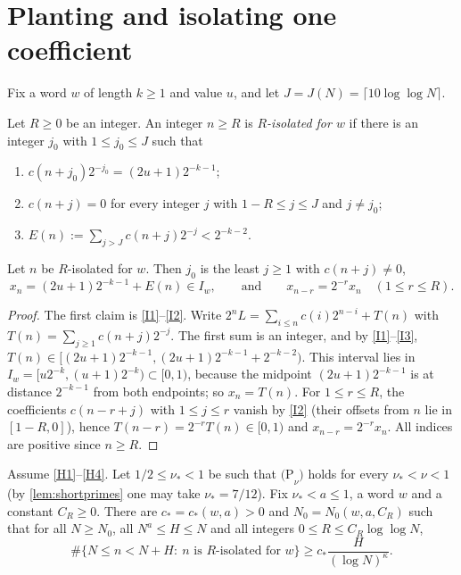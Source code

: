 \documentclass[11pt]{article}
\begin{document}
\section{Planting and isolating one coefficient}\label{sec:planting}

Fix a word $w$ of length $k\ge1$ and value $u$, and let
$J=J(N)=\lceil10\log\log N\rceil$.

\begin{definition}\label{def:isolated}
Let $R\ge0$ be an integer. An integer $n\ge R$ is \emph{$R$-isolated for $w$}
if there is an integer $j_0$ with $1\le j_0\le J$ such that
\begin{enumerate}[label=\textup{(I\arabic*)}]
\item\label{I1} $c(n+j_0)2^{-j_0}=(2u+1)2^{-k-1}$;
\item\label{I2} $c(n+j)=0$ for every integer $j$ with $1-R\le j\le J$ and $j\ne j_0$;
\item\label{I3} $E(n):=\sum_{j>J}c(n+j)2^{-j}<2^{-k-2}$.
\end{enumerate}
\end{definition}

\begin{lemma}\label{lem:isolated}
Let $n$ be $R$-isolated for $w$. Then $j_0$ is the least
$j\ge1$ with $c(n+j)\ne0$,
\[
x_n=(2u+1)2^{-k-1}+E(n)\in I_w,\qquad\text{and}\qquad x_{n-r}=2^{-r}x_n\quad(1\le r\le R).
\]
\end{lemma}

\begin{proof}
The first claim is \ref{I1}--\ref{I2}. Write
$2^{n}L=\sum_{i\le n}c(i)2^{n-i}+T(n)$ with $T(n)=\sum_{j\ge1}c(n+j)2^{-j}$. The
first sum is an integer, and by \ref{I1}--\ref{I3},
$T(n)\in[(2u+1)2^{-k-1},(2u+1)2^{-k-1}+2^{-k-2})$. This interval lies in
$I_w=[u2^{-k},(u+1)2^{-k})\subset[0,1)$, because the midpoint
$(2u+1)2^{-k-1}$ is at distance $2^{-k-1}$ from both endpoints; so
$x_n=T(n)$. For $1\le r\le R$, the coefficients $c(n-r+j)$ with $1\le j\le r$
vanish by \ref{I2} (their offsets from $n$ lie in $[1-R,0]$), hence
$T(n-r)=2^{-r}T(n)\in[0,1)$ and $x_{n-r}=2^{-r}x_n$. All indices are positive
since $n\ge R$.
\end{proof}

\begin{proposition}\label{prop:planting}
Assume \ref{H1}--\ref{H4}. Let $1/2\le\nu_*<1$ be such that
$\mathrm{(P}_\nu\mathrm{)}$ holds for every $\nu_*<\nu<1$ \textup{(}by
\cref{lem:shortprimes} one may take $\nu_*=7/12$\textup{)}. Fix $\nu_*<a\le1$, a
word $w$ and a constant $C_R\ge0$. There are $c_*=c_*(w,a)>0$ and $N_0=N_0(w,a,C_R)$ such that for all
$N\ge N_0$, all $N^a\le H\le N$ and all integers $0\le R\le C_R\log\log N$,
\[
\#\{N\le n<N+H:\ n\text{ is $R$-isolated for $w$}\}\ge c_*\frac{H}{(\log N)^{\kappa}} .
\]
\end{proposition}
\end{document}
